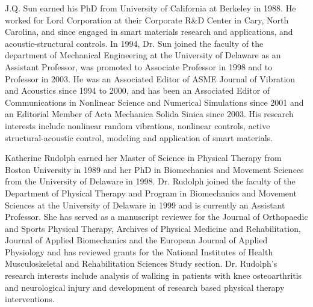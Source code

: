 \begin{biography}{J.Q. Sun}
earned his PhD from University of California at Berkeley in 1988.  He worked for Lord Corporation at their Corporate R\&D Center in Cary, North Carolina, and since engaged in smart materials research and applications, and acoustic-structural controls.  In 1994, Dr. Sun joined the faculty of the department of Mechanical Engineering at the University of Delaware as an Assistant Professor, was promoted to Associate Professor in 1998 and to Professor in 2003.  He was an Associated Editor of ASME Journal of Vibration and Acoustics since 1994 to 2000, and has been an Associated Editor of Communications in Nonlinear Science and Numerical Simulations since 2001 and an Editorial Member of Acta Mechanica Solida Sinica since 2003.  His research interests include nonlinear random vibrations, nonlinear controls, active structural-acoustic control, modeling and application of smart materials.
\end{biography}

\begin{biography}{Katherine Rudolph}
earned her Master of Science in Physical Therapy from Boston University in 1989 and her PhD in Biomechanics and Movement Sciences from the University of Delaware in 1998.  Dr. Rudolph joined the faculty of the Department of Physical Therapy and Program in Biomechanics and Movement Sciences at the University of Delaware in 1999 and is currently an Assistant Professor.  She has served as a manuscript reviewer for the Journal of Orthopaedic and Sports Physical Therapy, Archives of Physical Medicine and Rehabilitation, Journal of Applied Biomechanics and the European Journal of Applied Physiology and has reviewed grants for the National Institutes of Health Musculoskeletal and Rehabilitation Sciences Study section. Dr. Rudolph's research interests include analysis of walking in patients with knee osteoarthritis and neurological injury and development of research based physical therapy interventions.
\end{biography}

